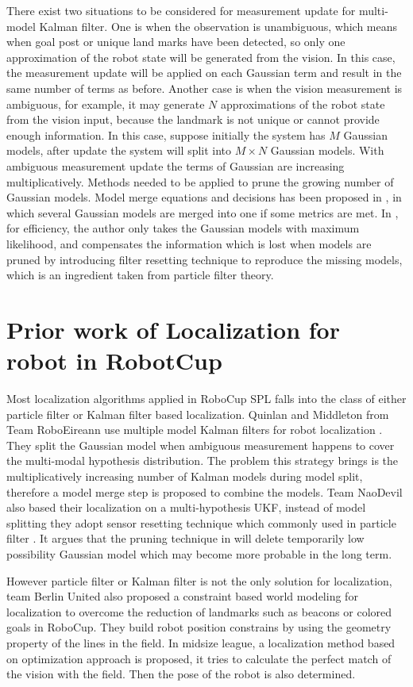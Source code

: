 There exist two situations to be considered for measurement update for multi-model Kalman filter. One is when the observation is unambiguous, which means when goal post or unique land marks have been detected, so only one approximation of the robot state will be generated from the vision. In this case, the measurement update will be applied on each Gaussian term and result in the same number of terms as before. Another case is when the vision measurement is ambiguous, for example, it may generate $N$ approximations of the robot state from the vision input, because the landmark is not unique or cannot provide enough information. In this case, suppose initially the system has $M$ Gaussian models, after update the system will split into $M \times N$ Gaussian models. With ambiguous measurement update the terms of Gaussian are increasing multiplicatively. Methods needed to be applied to prune the growing number of Gaussian models. Model merge equations and decisions has been proposed in \cite{Quinlan2010}, in which several Gaussian models are merged into one if some metrics are met. In \cite{Jochmann2012}, for efficiency, the author only takes the Gaussian models with maximum likelihood, and compensates the information which is lost when models are pruned by introducing filter resetting technique to reproduce the missing models, which is an ingredient taken from particle filter theory.

\section{Prior work of Localization for robot in RobotCup}\label{sec:2.2}
Most localization algorithms applied in RoboCup \gls{SPL} falls into the class of either particle filter or Kalman filter based localization. Quinlan and Middleton from Team RoboEireann use multiple model Kalman filters for robot localization \cite{Quinlan2010}. They split the Gaussian model when ambiguous measurement happens to cover the multi-modal hypothesis distribution. The problem this strategy brings is the multiplicatively increasing number of Kalman models during model split, therefore a model merge step is proposed to combine the models. Team NaoDevil also based their localization on a multi-hypothesis \gls{UKF}, instead of model splitting they adopt sensor resetting technique which commonly used in particle filter \cite{Jochmann2012}. It argues that the  pruning technique in \cite{Quinlan2010} will delete temporarily low possibility Gaussian model which may become more probable in the long term.

However particle filter or Kalman filter is not the only solution for localization, team Berlin United also proposed a constraint based world modeling for localization \cite{Gohring2009} to overcome the reduction of landmarks such as beacons or colored goals in RoboCup. They build robot position constrains by using the geometry property of the lines in the field. In midsize league, a localization method based on optimization approach \cite{Lauer2006} is proposed, it tries to calculate the perfect match of the vision with the field. Then the pose of the robot is also determined.
